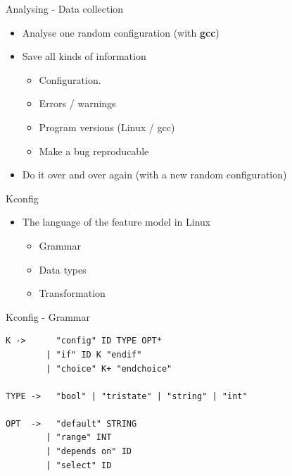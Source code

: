 \documentclass[mathserif,serif]{beamer}
\newenvironment{items}{
\begin{itemize}
  \setlength{\itemsep}{0pt}
  \setlength{\parskip}{7pt}
  \setlength{\parsep}{4pt}
}{\end{itemize}}
\begin{document}
\begin{frame}[t]{Analysing - Data collection}

    \begin{items}
        \item Analyse one random configuration \pause(with \textbf{gcc})
        \pause
        \item Save all kinds of information
        \begin{items}
            \item Configuration.
            \pause
            \item Errors / warnings
            \pause
            \item Program versions (Linux / gcc)
            \pause
            \item Make a bug reproducable
        \end{items}
        \pause
        \item Do it over and over again (with a new random configuration)
    \end{items}


\end{frame}

\begin{frame}[t]{Kconfig}

    \begin{items}
        \item The language of the feature model in Linux \color{gray}{(Busybox and others)}
        \pause
        \begin{items}
            \item Grammar
            \item Data types
            \item Transformation
        \end{items}

    \end{items}
\end{frame}

\begin{frame}[t,fragile]{Kconfig - Grammar}
    \begin{Verbatim}
K ->      "config" ID TYPE OPT*
        | "if" ID K "endif"
        | "choice" K+ "endchoice"

TYPE ->   "bool" | "tristate" | "string" | "int"

OPT  ->   "default" STRING
        | "range" INT
        | "depends on" ID
        | "select" ID
    \end{Verbatim}
\end{frame}
\end{document}
